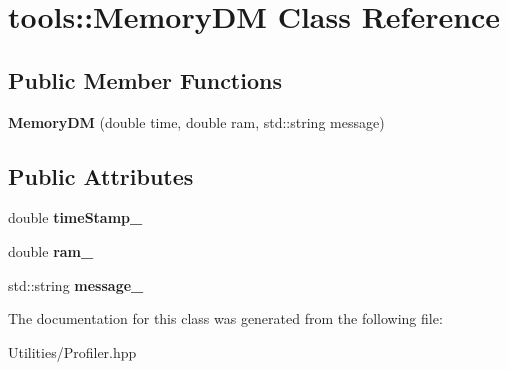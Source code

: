 \hypertarget{classtools_1_1_memory_d_m}{\section{tools\+:\+:Memory\+D\+M Class Reference}
\label{classtools_1_1_memory_d_m}
}
\subsection*{Public Member Functions}
\begin{DoxyCompactItemize}
\item 
\hypertarget{classtools_1_1_memory_d_m_a91c08d69548b78d921e61b045675b4f6}{{\bfseries Memory\+D\+M} (double time, double ram, std\+::string message)}\label{classtools_1_1_memory_d_m_a91c08d69548b78d921e61b045675b4f6}

\end{DoxyCompactItemize}
\subsection*{Public Attributes}
\begin{DoxyCompactItemize}
\item 
\hypertarget{classtools_1_1_memory_d_m_a1b4a075fcf5442e4e1565bcea8df7245}{double {\bfseries time\+Stamp\+\_\+}}\label{classtools_1_1_memory_d_m_a1b4a075fcf5442e4e1565bcea8df7245}

\item 
\hypertarget{classtools_1_1_memory_d_m_a2adc7e67ea5ad1255a80cbd50fb6c6f4}{double {\bfseries ram\+\_\+}}\label{classtools_1_1_memory_d_m_a2adc7e67ea5ad1255a80cbd50fb6c6f4}

\item 
\hypertarget{classtools_1_1_memory_d_m_a6eff395873dec70ad05162d31d1761e1}{std\+::string {\bfseries message\+\_\+}}\label{classtools_1_1_memory_d_m_a6eff395873dec70ad05162d31d1761e1}

\end{DoxyCompactItemize}


The documentation for this class was generated from the following file\+:\begin{DoxyCompactItemize}
\item 
Utilities/Profiler.\+hpp\end{DoxyCompactItemize}
